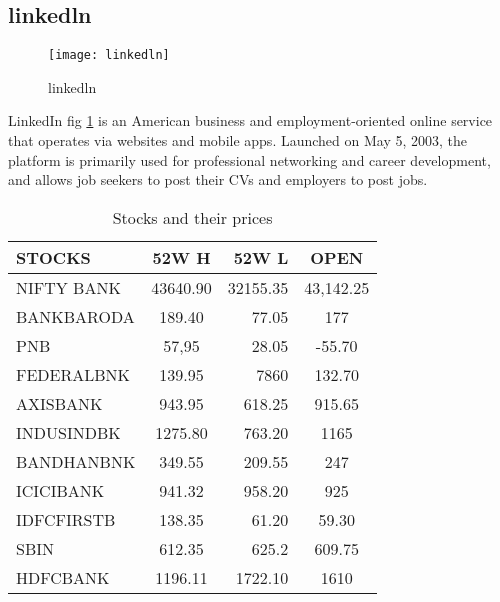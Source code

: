 \documentclass[12 pt]{article}
\begin{document}
\subsection{linkedln}
\begin{figure}[h]
\centering
\texttt{[image: linkedln]}
\caption{linkedln}
\label{fig1:linkedln}
\end{figure}
LinkedIn fig \ref{fig1:linkedln} is an American business and employment-oriented online service that operates via websites and mobile apps. Launched on May 5, 2003, the platform is primarily used for professional networking and career development, and allows job seekers to post their CVs and employers to post jobs.
\begin{table}[h]
\caption{Stocks and their prices}
\begin{center}
\begin{tabular}{ | l | c | r | c |}
\hline
STOCKS & 52W H & 52W L & OPEN \\ \hline
NIFTY BANK & 43640.90  & 32155.35  &43,142.25 \\ \hline
BANKBARODA & 189.40  &77.05 & 177 \\ \hline
PNB &  57,95 & 28.05  & -55.70 \\ \hline
FEDERALBNK  &  139.95 & 7860  &132.70  \\ \hline
AXISBANK  &  943.95 & 618.25  & 915.65 \\ \hline
INDUSINDBK  & 1275.80  & 763.20  & 1165 \\ \hline
BANDHANBNK  & 349.55  & 209.55  &  247\\ \hline
ICICIBANK  &941.32   & 958.20  &  925\\ \hline
IDFCFIRSTB  &  138.35 &  61.20 &  59.30\\ \hline
SBIN  &  612.35 & 625.2  & 609.75 \\ \hline
HDFCBANK	  & 1196.11  & 1722.10  &1610  \\ \hline
\end{tabular}
\end{center}
\end{table}
\end{document}
